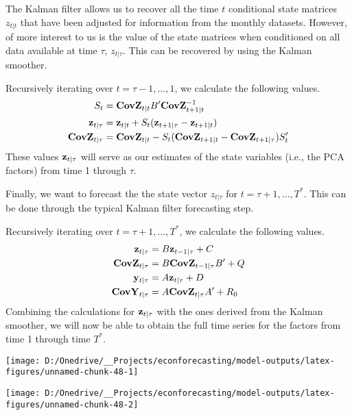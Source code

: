 \documentclass[11pt, letterpaper]{article}\usepackage[]{graphicx}\usepackage[]{color}
\newcommand{\vv}[1]{\textcolor{black}{\mathbf{#1}}}
\begin{document}
The Kalman filter allows us to recover all the time $t$ conditional state matrices $z_{t|t}$ that have been adjusted for information from the monthly datasets. However, of more interest to us is the value of the state matrices when conditioned on all data available at time $\tau$, $z_{t|\tau}$. This can be recovered by using the Kalman smoother.

Recursively iterating over $t = \tau - 1, \dots, 1$, we calculate the following values. 
\begin{align*}
	S_{t} &= \vv{CovZ}_{t|t} B' \vv{CovZ}^{-1}_{t + 1|t}\\
	\vv{z}_{t|\tau} &= \vv{z}_{t|t} + S_t (\vv{z}_{t+1|\tau} - \vv{z}_{t + 1|t})\\
	\vv{CovZ}_{t|\tau} &= \vv{CovZ}_{t|t} - S_t(\vv{CovZ}_{t + 1|t} - \vv{CovZ}_{t + 1|\tau})S'_t
\end{align*}
These values $\vv{z}_{t|\tau}$ will serve as our estimates of the state variables (i.e., the PCA factors) from time 1 through $\tau$.

Finally, we want to forecast the the state vector $z_{t|\tau}$ for $t = \tau + 1, \dots, T^*$. This can be done through the typical Kalman filter forecasting step.

Recursively iterating over $t = \tau + 1, \dots, T^*$, we calculate the following values.
\begin{align*}
	\vv{z}_{t|\tau} &= B \vv{z}_{t-1|\tau} + C\\
	\vv{CovZ}_{t|\tau} &= B \vv{CovZ}_{t-1|\tau} B'+ Q\\
	\vv{y}_{t|\tau} &= A \vv{z}_{t|\tau} + D\\
	\vv{CovY}_{t|\tau} &= A \vv{CovZ}_{t|\tau} A' + R_0
\end{align*}
Combining the calculations for $\vv{z}_{t|\tau}$ with the ones derived from the Kalman smoother, we will now be able to obtain the full time series for the factors from time 1 through time $T^*$.



{\centering \texttt{[image: D:/Onedrive/\_\_Projects/econforecasting/model-outputs/latex-figures/unnamed-chunk-48-1]} 

}




{\centering \texttt{[image: D:/Onedrive/\_\_Projects/econforecasting/model-outputs/latex-figures/unnamed-chunk-48-2]} 

}
\end{document}
